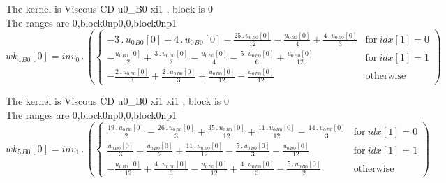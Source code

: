 \documentclass{article}
\begin{document}
\noindent The kernel is Viscous CD u0_B0 xi1 , block is 0\\\noindent The ranges are 0,block0np0,0,block0np1\\\begin{dmath}{wk_{4}{_{B0}}}[{0}] = inv_0 \,.\, \left(\begin{cases} - 3 \,.\, {u_{0}{_{B0}}}[{0}] + 4 \,.\, {u_{0}{_{B0}}}[{0}] - \frac{25 \,.\, {u_{0}{_{B0}}}[{0}]}{12} - \frac{{u_{0}{_{B0}}}[{0}]}{4} + \frac{4 \,.\, {u_{0}{_{B0}}}[{0}]}{3} & 
\text{for}\: {idx}[{1}] = 0 \\- \frac{{u_{0}{_{B0}}}[{0}]}{2} + \frac{3 \,.\, {u_{0}{_{B0}}}[{0}]}{2} - \frac{{u_{0}{_{B0}}}[{0}]}{4} - \frac{5 \,.\, {u_{0}{_{B0}}}[{0}]}{6} + \frac{{u_{0}{_{B0}}}[{0}]}{12} & \text{for}\: {idx}[{1}] = 1 \\- \frac{2 
\,.\, {u_{0}{_{B0}}}[{0}]}{3} + \frac{2 \,.\, {u_{0}{_{B0}}}[{0}]}{3} + \frac{{u_{0}{_{B0}}}[{0}]}{12} - \frac{{u_{0}{_{B0}}}[{0}]}{12} & \text{otherwise} \end{cases}\right)\end{dmath}

\noindent The kernel is Viscous CD u0_B0 xi1 xi1 , block is 0\\\noindent The ranges are 0,block0np0,0,block0np1\\\begin{dmath}{wk_{5}{_{B0}}}[{0}] = inv_1 \,.\, \left(\begin{cases} \frac{19 \,.\, {u_{0}{_{B0}}}[{0}]}{2} - \frac{26 \,.\, {u_{0}{_{B0}}}[{0}]}{3} + \frac{35 \,.\, {u_{0}{_{B0}}}[{0}]}{12} + \frac{11 \,.\, {u_{0}{_{B0}}}[{0}]}{12} - \frac{14 \,.\, 
{u_{0}{_{B0}}}[{0}]}{3} & \text{for}\: {idx}[{1}] = 0 \\\frac{{u_{0}{_{B0}}}[{0}]}{3} + \frac{{u_{0}{_{B0}}}[{0}]}{2} + \frac{11 \,.\, {u_{0}{_{B0}}}[{0}]}{12} - \frac{5 \,.\, {u_{0}{_{B0}}}[{0}]}{3} - \frac{{u_{0}{_{B0}}}[{0}]}{12} & \text{for}\: 
{idx}[{1}] = 1 \\- \frac{{u_{0}{_{B0}}}[{0}]}{12} + \frac{4 \,.\, {u_{0}{_{B0}}}[{0}]}{3} - \frac{{u_{0}{_{B0}}}[{0}]}{12} + \frac{4 \,.\, {u_{0}{_{B0}}}[{0}]}{3} - \frac{5 \,.\, {u_{0}{_{B0}}}[{0}]}{2} & \text{otherwise} 
\end{cases}\right)\end{dmath}
\end{document}
